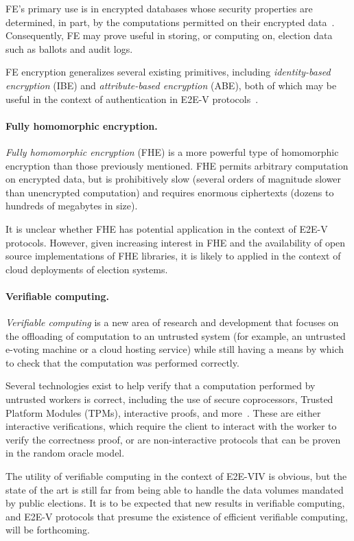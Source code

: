 FE's primary use is in encrypted databases whose security properties
are determined, in part, by the computations permitted on their
encrypted data~\cite{Popa11}. Consequently, FE may prove useful in
storing, or computing on, election data such as ballots and audit
logs.

FE encryption generalizes several existing primitives, including
\emph{identity-based encryption} (IBE) and \emph{attribute-based
  encryption} (ABE), both of which may be useful in the context of
authentication in E2E-V
protocols~\cite{shamir1985identity,goyal2006attribute}.

\paragraph{Fully homomorphic encryption.} \emph{Fully homomorphic
  encryption} (FHE) is a more powerful type of homomorphic encryption
than those previously mentioned. FHE permits arbitrary computation on
encrypted data, but is prohibitively slow (several orders of magnitude
slower than unencrypted computation) and requires enormous ciphertexts
(dozens to hundreds of megabytes in size).

It is unclear whether FHE has potential application in the context of
E2E-V protocols. However, given increasing interest in FHE and the
availability of open source implementations of FHE libraries, it is
likely to applied in the context of cloud deployments of election
systems.

\paragraph{Verifiable computing.} \emph{Verifiable computing} is a new
area of research and development that focuses on the offloading of
computation to an untrusted system (for example, an untrusted e-voting
machine or a cloud hosting service) while still having a means by
which to check that the computation was performed correctly.

Several technologies exist to help verify that a computation performed
by untrusted workers is correct, including the use of secure
coprocessors, Trusted Platform Modules (TPMs), interactive proofs, and
more~\cite{king2013trusted,perez2006vtpm,sparks2007security}. These
are either interactive verifications, which require the client to
interact with the worker to verify the correctness proof, or are
non-interactive protocols that can be proven in the random oracle
model.

The utility of verifiable computing in the context of E2E-VIV is
obvious, but the state of the art is still far from being able to
handle the data volumes mandated by public elections. It is to be
expected that new results in verifiable computing, and E2E-V protocols
that presume the existence of efficient verifiable computing, will be
forthcoming.

